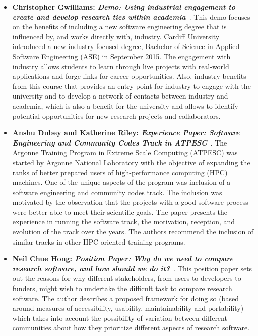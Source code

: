 \documentclass[11pt, oneside]{amsart}
\begin{document}
\begin{itemize}
\item \textbf{Christopher Gwilliams: \emph{Demo: Using industrial engagement to
create and develop research ties within academia}}~\cite{Gwilliams:2016ws}.
This demo focuses on the benefits of including a  new  software engineering
degree that is influenced by, and works directly with,
industry.  Cardiff  University  introduced  a  new  industry-focused  degree,
Bachelor of Science in Applied Software Engineering (ASE) in September
2015. The engagement with industry allows students to learn through live
projects  with  real-world  applications and forge links for career opportunities.
Also, industry benefits from this course that provides an entry point for industry
to engage with the university and to develop a network of contacts between industry
and academia, which is also a benefit for the university and allows to identify
potential opportunities for new research projects and collaborators.

\item \textbf{Anshu Dubey and Katherine Riley: \emph{Experience Paper: Software
Engineering and Community Codes Track in ATPESC}}~\cite{Dubey1:2016ws}.
The Argonne Training Program in Extreme Scale
Computing (ATPESC) was started by Argonne National Laboratory with the objective
of expanding the ranks of better prepared users of high-performance computing (HPC) machines.
One of the unique aspects of the program was inclusion of a
software engineering and community codes track. The inclusion
was motivated by the observation that the projects with a good
software process were better able to meet their scientific goals.
The paper presents the experience in running the software
track, the motivation, reception, and evolution of the track over the years.
The authors recommend the inclusion of similar tracks in other HPC-oriented training programs.

\item \textbf{Neil Chue Hong: \emph{Position Paper: Why do we need to compare
research software, and how should we do it?}}~\cite{ChueHong:2016ws}.
This position paper sets out the reasons for why different stakeholders,
from users to developers to funders, might wish to undertake the difficult task
to compare research software. The author describes a proposed framework for doing
so (based around measures of accessibility, usability, maintainability and
portability) which takes into account the possibility of variation between
different communities about how they prioritize different aspects of research software.


\end{itemize}
\end{document}
